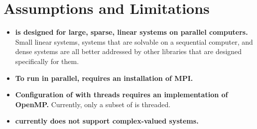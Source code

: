 
\section{Assumptions and Limitations}

\begin{itemize}

\item
{\bf \hypre{} is designed for large, sparse, linear systems on
parallel computers.}  Small linear systems, systems that are solvable
on a sequential computer, and dense systems are all better addressed
by other libraries that are designed specifically for them.

\item
{\bf To run in parallel, \hypre{} requires an installation of MPI.}

\item
{\bf Configuration of \hypre{} with threads requires an implementation
of OpenMP.}  Currently, only a subset of \hypre{} is threaded.

\item
{\bf \hypre{} currently does not support complex-valued systems.}

\end{itemize}

